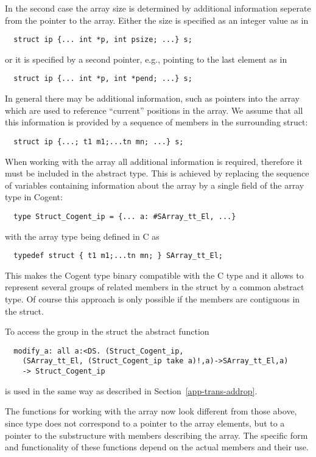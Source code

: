 In the second case the array size is determined by additional information seperate from the pointer to the array.
Either the size is specified as an integer value as in 
\begin{verbatim}
  struct ip {... int *p, int psize; ...} s;
\end{verbatim}
or it is specified by a second pointer, e.g., pointing to the last element as in
\begin{verbatim}
  struct ip {... int *p, int *pend; ...} s;
\end{verbatim}
In general there may be additional information, such as pointers into the array which are used to reference
``current'' positions in the array. We assume that all this information is provided by a sequence of members
in the surrounding struct:
\begin{verbatim}
  struct ip {...; t1 m1;...tn mn; ...} s;
\end{verbatim}
When working with the array all additional information is required, therefore it must be included in the abstract
type. This is achieved by replacing the sequence of variables containing information about the array by a single
field of the array type in Cogent:
\begin{verbatim}
  type Struct_Cogent_ip = {... a: #SArray_tt_El, ...}
\end{verbatim}
with the array type being defined in C as
\begin{verbatim}
  typedef struct { t1 m1;...tn mn; } SArray_tt_El;
\end{verbatim}
This makes the Cogent type  binary compatible with the C type  and it allows
to represent several groups of related members in the struct by a common abstract type. Of course this approach is 
only possible if the members are contiguous in the struct.

To access the group in the struct the abstract function
\begin{verbatim}
  modify_a: all a:<DS. (Struct_Cogent_ip,
    (SArray_tt_El, (Struct_Cogent_ip take a)!,a)->SArray_tt_El,a)
    -> Struct_Cogent_ip
\end{verbatim}
is used in the same way as described in Section~\ref{app-trans-addrop}.

The functions for working with the array now look different from those above, since type 
does not correspond to a pointer to the array elements, but to a pointer to the substructure with members describing
the array. The specific form and functionality of these functions depend on the actual members and their use.

